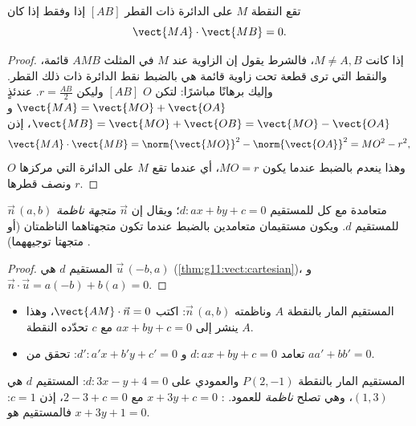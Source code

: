 \begin{proposition}\label{prop:g11:scal:diameter}
تقع النقطة $M$ على الدائرة ذات القطر $[AB]$ إذا وفقط إذا كان
\[
\vect{MA} \cdot \vect{MB} = 0 .
\]
\end{proposition}

\begin{proof}
إذا كانت $M \neq A, B$، فالشرط يقول إن الزاوية عند $M$ في المثلث
$AMB$ قائمة، والنقط التي ترى قطعة تحت زاوية قائمة هي
بالضبط نقط الدائرة ذات ذلك القطر. وإليك برهانًا مباشرًا:
لتكن $O$  $[AB]$ وليكن $r = \frac{AB}{2}$. عندئذٍ
$\vect{MA} = \vect{MO} + \vect{OA}$ و
$\vect{MB} = \vect{MO} + \vect{OB} = \vect{MO} - \vect{OA}$، إذن
\[
\vect{MA}\cdot\vect{MB}
= \norm{\vect{MO}}^2 - \norm{\vect{OA}}^2 = MO^2 - r^2,
\]
وهذا ينعدم بالضبط عندما يكون $MO = r$، أي عندما تقع $M$ على الدائرة
التي مركزها $O$ ونصف قطرها $r$.
\end{proof}

\begin{proposition}\label{prop:g11:scal:normal}
 $\vec n\,(a, b)$ متعامدة مع كل  للمستقيم
$d : ax + by + c = 0$؛ ويقال إن $\vec n$ \emph{متجهة
ناظمة} للمستقيم $d$. ويكون مستقيمان متعامدين بالضبط
عندما تكون متجهتاهما الناظمتان (أو متجهتا توجيههما) .
\end{proposition}

\begin{proof}
 المستقيم $d$ هي $\vec u\,(-b, a)$
(\cref{thm:g11:vect:cartesian})، و
$\vec n \cdot \vec u = a(-b) + b(a) = 0$.
\end{proof}

\begin{method}\label{met:g11:scal:normal}
\begin{itemize}
  \item المستقيم المار بالنقطة $A$ وناظمته $\vec n\,(a,b)$: اكتب
        $\vect{AM} \cdot \vec n = 0$، وهذا ينشر إلى $ax + by + c = 0$
        مع $c$ تحدّده النقطة $A$.
  \item تعامد $d: ax+by+c = 0$ و $d': a'x+b'y+c' = 0$:
        تحقق من $aa' + bb' = 0$.
\end{itemize}
\end{method}

\begin{example}\label{ex:g11:scal:perpline}
المستقيم المار بالنقطة $P(2, -1)$ والعمودي على $d : 3x - y + 4 = 0$:  المستقيم $d$ هي $(1, 3)$، وهي تصلح  \emph{ناظمة}
للعمود. : $x + 3y + c = 0$ مع
$2 - 3 + c = 0$، إذن $c = 1$: فالمستقيم هو $x + 3y + 1 = 0$.
\end{example}

